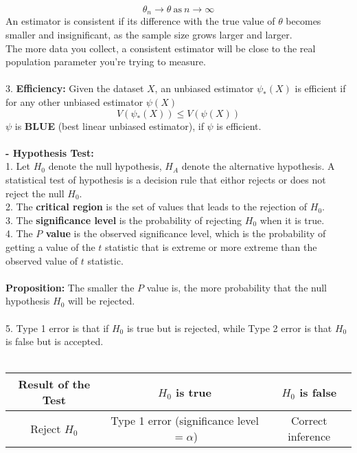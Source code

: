 \documentclass{article}
\begin{document}
\begin{enumerate}[S1 - ]
\begin{equation*}
    \theta_n \rightarrow \theta \ \text{as} \ n \rightarrow \infty
    \end{equation*}
    An estimator is consistent if its difference with the true value of $\theta$ becomes smaller and insignificant, as the sample size grows larger and larger.\\
    The more data you collect, a consistent estimator will be close to the real population parameter you’re trying to measure.\\
    \\
    3. \textbf{Efficiency:} Given the dataset $X$, an unbiased estimator $\psi_{*}(X)$ is efficient if for any other unbiased estimator $\psi(X)$
    \begin{equation*}
    V(\psi_{*}(X)) \leq V(\psi(X))
    \end{equation*}
    $\psi$ is \textbf{BLUE} (best linear unbiased estimator), if $\psi$ is efficient.\\
    \\
    \textbf{- Hypothesis Test:}\\
    1. Let $H_0$ denote the null hypothesis, $H_A$ denote the alternative hypothesis. A statistical test of hypothesis is a decision rule that eithor rejects or does not reject the null $H_{0}$.\\
    2. The \textbf{critical region} is the set of values that leads to the rejection of $H_0$.\\
    3. The \textbf{significance level} is the probability of rejecting $H_0$ when it is true.\\
    4. The \textbf{$P$ value} is the observed significance level, which is the probability of getting a value of the $t$ statistic that is extreme or more extreme than the observed value of $t$ statistic.\\
    \\
    \textbf{Proposition:} The smaller the $P$ value is, the more probability that the null hypothesis $H_0$ will be rejected.\\
    \\
    5. Type 1 error is that if $H_0$ is true but is rejected, while Type 2 error is that $H_0$ is false but is accepted.\\
    \\
    \begin{tabular}{ccc}
    \hline
    Result of the Test & $H_0$ is true & $H_0$ is false\\
    \hline
    Reject $H_0$ & Type 1 error (significance level $= \alpha$) & Correct inference\\

\end{tabular}
\end{enumerate}
\end{document}
